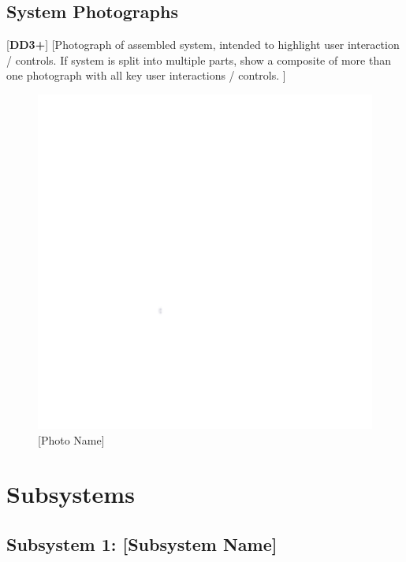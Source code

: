 \documentclass[letterpaper, 11pt]{article}
\begin{document}
\subsection{System Photographs} %
[\textbf{DD3+}]
[Photograph of assembled system, intended to highlight user interaction / controls. If system is split into multiple parts, show a composite of more than one photograph with all key user interactions / controls. ]
\begin{figure}[h]
    \centering
    \includegraphics[width=16cm]{white.png} %
    \caption{[Photo Name]}
\end{figure}

\clearpage
\section{Subsystems}

\subsection{Subsystem 1: [Subsystem Name]}

\end{document}
